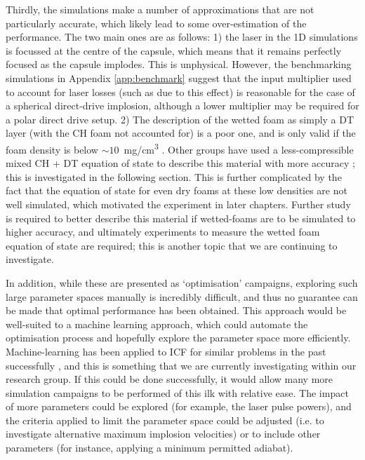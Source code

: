 Thirdly, the simulations make a number of approximations that are not particularly accurate, which likely lead to some over-estimation of the performance. The two main ones are as follows: 1) the laser in the 1D simulations is focussed at the centre of the capsule, which means that it remains perfectly focused as the capsule implodes. This is unphysical. However, the benchmarking simulations in Appendix \ref{app:benchmark} suggest that the input multiplier used to account for laser losses (such as due to this effect) is reasonable for the case of a spherical direct-drive implosion, although a lower multiplier may be required for a polar direct drive setup. 2) The description of the wetted foam as simply a DT layer (with the CH foam not accounted for) is a poor one, and is only valid if the foam density is below $\sim10$~\si[per-mode=symbol]{\milli\gram\per\centi\meter\cubed} \cite{CHFoamLim}. Other groups have used a less-compressible mixed CH + DT equation of state to describe this material with more accuracy \cite{Olson2021}; this is investigated in the following section. This is further complicated by the fact that the equation of state for even dry foams at these low densities are not well simulated, which motivated the experiment in later chapters. Further study is required to better describe this material if wetted-foams are to be simulated to higher accuracy, and ultimately experiments to measure the wetted foam equation of state are required; this is another topic that we are continuing to investigate.

In addition, while these are presented as `optimisation' campaigns, exploring such large parameter spaces manually is incredibly difficult, and thus no guarantee can be made that optimal performance has been obtained. This approach would be well-suited to a machine learning approach, which could automate the optimisation process and hopefully explore the parameter space more efficiently. Machine-learning has been applied to ICF for similar problems in the past successfully \cite{Hatfield2019}, and this is something that we are currently investigating within our research group. If this could be done successfully, it would allow many more simulation campaigns to be performed of this ilk with relative ease. The impact of more parameters could be explored (for example, the laser pulse powers), and the criteria applied to limit the parameter space could be adjusted (i.e. to investigate alternative maximum implosion velocities) or to include other parameters (for instance, applying a minimum permitted adiabat).

